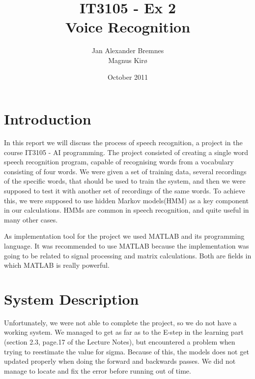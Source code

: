 \documentclass[titlepage]{article}
\author{Jan Alexander Bremnes\\Magnus Kirø}
\title{IT3105 - Ex 2\\Voice Recognition}
\date{October 2011}
\begin{document}
    \maketitle
    \tableofcontents
    \graphicspath{{SRS/img/}}
    \newpage

\section{Introduction}
In this report we will discuss the process of speech recognition, a project in the course IT3105 - AI programming. The project consisted of creating a single word speech recognition program, capable of recognising words from a vocabulary consisting of four words. We were given a set of training data, several recordings of the specific words, that should be used to train the system, and then we were supposed to test it with another set of recordings of the same words. To achieve this, we were supposed to use hidden Markov models(HMM) as a key component in our calculations. HMMs are common in speech recognition, and quite useful in many other cases. 

As implementation tool for the project we used MATLAB and its programming language. It was recommended to use MATLAB because the implementation was going to be related to signal processing and matrix calculations. Both are fields in which MATLAB is really powerful.

\section{System Description}
    Unfortunately, we were not able to complete the project, so we do not have a working system. We managed to get as far as to the E-step in the learning part (section 2.3, page.17 of the Lecture Notes), but encountered a problem when trying to reestimate the value for sigma. Because of this, the models does not get updated properly when doing the forward and backwards passes. We did not manage to locate and fix the error before running out of time.
\end{document}
